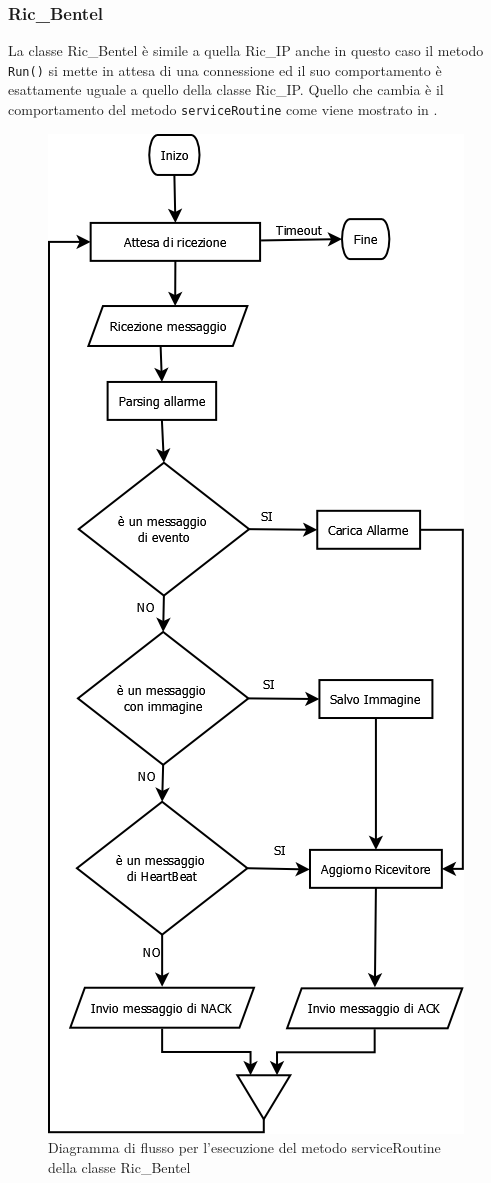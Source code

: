 \subsubsection{Ric\_Bentel}
La classe Ric\_Bentel è simile a quella Ric\_IP anche in questo caso il metodo \texttt{Run()} si mette in attesa di una connessione ed il suo comportamento è esattamente uguale a quello della classe Ric\_IP. Quello che cambia è il comportamento del metodo \texttt{serviceRoutine} come viene mostrato in .
\begin{figure}
	\centering
	\includegraphics[width=0.7\linewidth]{pictures/servicebentel.png}
	\caption{Diagramma di flusso per l'esecuzione del metodo serviceRoutine della classe Ric\_Bentel}\label{fig:servicebentel}
\end{figure}
